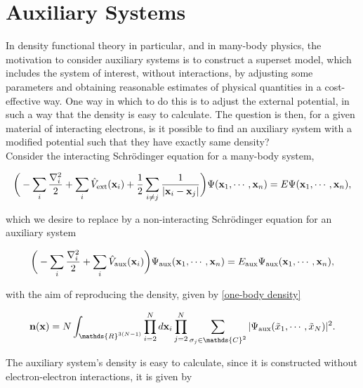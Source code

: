 \documentclass{homework}
\begin{document}
\section{Auxiliary Systems}

In density functional theory in particular, and in many-body physics, the motivation to consider auxiliary systems is to construct a superset model, which includes the system of interest, without interactions, by adjusting some parameters and obtaining reasonable estimates of physical quantities in a cost-effective way. One way in which to do this is to adjust the external potential, in such a way that the density is easy to calculate. The question is then, for a given material of interacting electrons, is it possible to find an auxiliary system with a modified potential such that they have exactly same density? \\

Consider the interacting Schr\"odinger equation for a many-body system, 

\begin{equation}
    \bigg(-\sum_{i} \frac{\nabla_i^2}{2} + \sum_{i}\hat{V}_{\textnormal{ext}}({\bf x}_i)  + \frac{1}{2} \sum_{i\neq j} \frac{1}{|{\bf x}_i - {\bf x}_j|}\bigg) \Psi({\bf x}_1, \cdots, {\bf x}_n) = E \Psi({\bf x}_1, \cdots, {\bf x}_n),
\end{equation}

which we desire to replace by a non-interacting Schr\"odinger equation for an auxiliary system 

\begin{equation}
    \bigg(-\sum_{i} \frac{\nabla_i^2}{2} + \sum_{i}\hat{V}_{\textnormal{aux}}({\bf x}_i)  \bigg) \Psi_{\textnormal{aux}}({\bf x}_1, \cdots, {\bf x}_n) = E_{\textnormal{aux}} \Psi_{\textnormal{aux}}({\bf x}_1, \cdots, {\bf x}_n),
\end{equation}

with the aim of reproducing the density, given by \eqref{one-body density}

\begin{equation}
{\bf n}({\bf x}) = N \int_{\mathds{R}^{3(N-1)}} \prod_{i=2}^N d{\bf x}_i \prod_{j=2}^{N} \sum_{\sigma_j \in \mathds{C}^2} |\Psi_{\textnormal{aux}}(\tilde{x}_1, \cdots, \tilde{x}_N) |^{2}.
\end{equation}

The auxiliary system's density is easy to calculate, since it is constructed without electron-electron interactions, it is given by 
\end{document}
